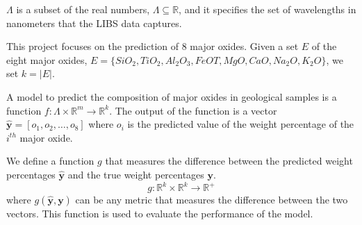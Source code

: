$\Lambda$ is a subset of the real numbers, $\Lambda \subseteq \mathbb{R}$, and it specifies the set of wavelengths in nanometers that the LIBS data captures.

This project focuses on the prediction of 8 major oxides.
Given a set $E$ of the eight major oxides, \(E = \{SiO_2, TiO_2, Al_2 O_3, FeOT, MgO, CaO, Na_2O, K_2O\}\), we set $k = |E|$.

A model to predict the composition of major oxides in geological samples is a function $f: \Lambda \times \mathbb{R}^m \rightarrow \mathbb{R}^k$.
The output of the function is a vector $\mathbf{\hat{y}} = [o_{1}, o_{2}, \ldots, o_{8}]$ where $o_{i}$ is the predicted value of the weight percentage of the $i^{th}$ major oxide.

We define a function $g$ that measures the difference between the predicted weight percentages $\mathbf{\hat{y}}$ and the true weight percentages $\mathbf{y}$.
$$
g: \mathbb{R}^k \times \mathbb{R}^k \rightarrow \mathbb{R}^{+}
$$
where $g(\mathbf{\hat{y}}, \mathbf{y})$ can be any metric that measures the difference between the two vectors. This function is used to evaluate the performance of the model.







